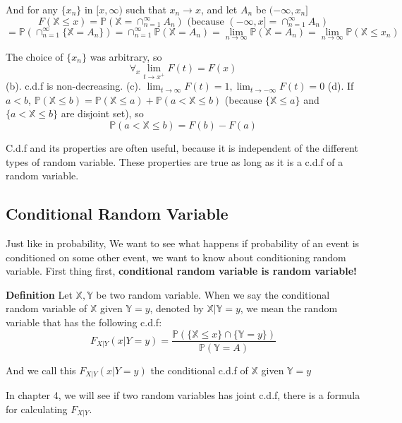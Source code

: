 \documentclass[a4paper,12pt]{article}
\begin{document}
And for any $\{x_n\}$ in $[x, \infty )$ such that $x_n\to x$, and let $A_n$ be $(-\infty, x_n]$
$$F(\mathbb{X}\leq x) = \mathbb{P}( \mathbb{X} = \cap_{n=1}^\infty A_n )
 \text{\ \ \ (because   } (-\infty, x] = \cap_{n=1}^\infty A_n )$$
$$= \mathbb{P}(\cap_{n=1}^\infty\{\mathbb{X} = A_n \}) = \cap_{n=1}^\infty\mathbb{P}(\mathbb{X} = A_n ) = \lim_{n\to\infty}\mathbb{P}(\mathbb{X} = A_n ) = \lim_{n\to\infty}\mathbb{P}(\mathbb{X} \leq x_n )$$

The choice of $\{x_n\}$ was arbitrary, so $$\forall_x \lim_{t\to x^+}F(t) = F(x)$$ 
(b). c.d.f is non-decreasing. 
(c). $\lim_{t\to \infty}F(t) = 1, \lim_{t\to -\infty}F(t) = 0$ 
(d). If $a<b$, $\mathbb{P}( \mathbb{X}\leq b ) = \mathbb{P}( \mathbb{X} \leq a ) + \mathbb{P}( a < \mathbb{X} \leq b )$ (because $\{\mathbb{X}\leq a\}$ and $\{a<\mathbb{X}\leq b\}$ are disjoint set), so $$\mathbb{P}( a < \mathbb{X} \leq b ) = F(b) - F(a)$$

C.d.f and its properties are often useful, because it is independent of the different types of random variable. These properties are true as long as it is a c.d.f of a random variable.

\subsection{Conditional Random Variable}
Just like in probability, We want to see what happens if probability of an event is conditioned on some other event, we want to know about conditioning random variable.
First thing first, \textbf{conditional random variable is random variable!} 

\textbf{Definition} Let $\mathbb{X}, \mathbb{Y}$ be two random variable. When we say the conditional random variable of $\mathbb{X}$ given $\mathbb{Y} = y$, denoted by $\mathbb{X}|{\mathbb{Y}=y} $, we mean the random variable that has the following c.d.f:
$$F_{X|Y}(x|Y=y) = \frac{\mathbb{P}( \{\mathbb{X} \leq x\} \cap \{\mathbb{Y} = y\} )}{\mathbb{P}(\mathbb{Y} = A)} $$

And we call this $F_{X|Y}(x|Y=y)$ the conditional c.d.f of $\mathbb{X}$ given $\mathbb{Y} = y$

In chapter 4, we will see if two random variables has joint c.d.f, there is a formula for calculating $F_{X|Y}$.
\end{document}
